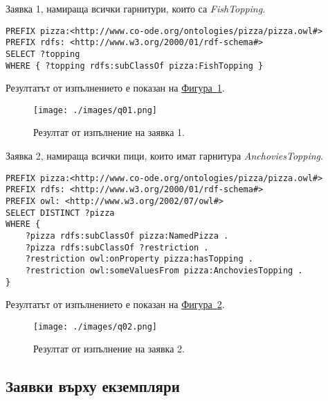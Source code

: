 \documentclass[12pt]{article}
\begin{document}
        Заявка 1, намираща всички гарнитури, които са \textit{FishTopping}.
        
        \begin{lstlisting}[language=SPARQL,style=sparql]
PREFIX pizza:<http://www.co-ode.org/ontologies/pizza/pizza.owl#>
PREFIX rdfs: <http://www.w3.org/2000/01/rdf-schema#>
SELECT ?topping
WHERE { ?topping rdfs:subClassOf pizza:FishTopping }\end{lstlisting}

        Резултатът от изпълнението е показан на \hyperref[fig:q01]{Фигура~\ref*{fig:q01}}.

        \begin{center}
            \begin{figure}
            \centering
                \texttt{[image: ./images/q01.png]}
                \caption{Резултат от изпълнение на заявка 1.}
                \label{fig:q01}
            \end{figure}
        \end{center}

\clearpage
\pagebreak

        Заявка 2, намираща всички пици, които имат гарнитура \textit{AnchoviesTopping}.

        \begin{lstlisting}[language=SPARQL,style=sparql]
PREFIX pizza:<http://www.co-ode.org/ontologies/pizza/pizza.owl#>
PREFIX rdfs: <http://www.w3.org/2000/01/rdf-schema#>
PREFIX owl: <http://www.w3.org/2002/07/owl#>
SELECT DISTINCT ?pizza
WHERE {
    ?pizza rdfs:subClassOf pizza:NamedPizza .
    ?pizza rdfs:subClassOf ?restriction .
    ?restriction owl:onProperty pizza:hasTopping .
    ?restriction owl:someValuesFrom pizza:AnchoviesTopping .
}\end{lstlisting}
    
        Резултатът от изпълнението е показан на \hyperref[fig:q02]{Фигура~\ref*{fig:q02}}.

        \begin{center}
            \begin{figure}
            \centering
                \texttt{[image: ./images/q02.png]}
                \caption{Резултат от изпълнение на заявка 2.}
                \label{fig:q02}
            \end{figure}
        \end{center}
   
\clearpage
\pagebreak
     
    \subsection{Заявки върху екземпляри}
\end{document}
